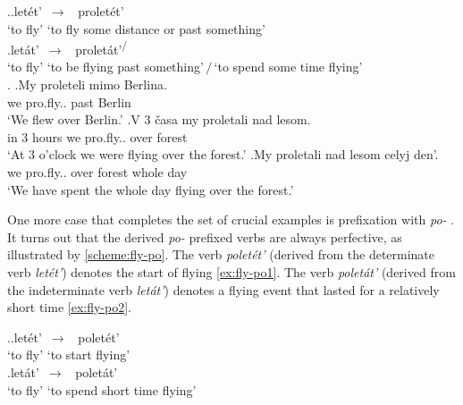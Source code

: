 \ex.\label{scheme:fly-pro}\ag.let\'{e}t'\textsuperscript{\IPF}~$\to$~ prolet\'{e}t'\textsuperscript{\PF}\\
{`to fly'} {`to fly some distance or past  something'}\\
\bg.let\'{a}t'\textsuperscript{\IPF}~$\to$~ prolet\'{a}t'\textsuperscript{\IPF\slash\PF}\\
{`to fly'} {`to be flying past  something'\,$/$\,`to spend some time flying'}\\

\ex.\label{ex:fly-pro}
\ag.\label{ex:fly-pro1}My proleteli\textsuperscript{\PF} mimo Berlina.\\
we pro.fly.. past  Berlin\\
\trans `We flew over Berlin.'
\bg.\label{ex:fly-pro2}V 3 \v{c}asa my proletali\textsuperscript{\IPF} nad lesom.\\
in 3 hours we pro.fly.. over forest\\
\trans `At 3 o'clock we were flying over the forest.'
\bg.\label{ex:fly-pro3}My proletali\textsuperscript{\PF} nad lesom celyj den'.\\
we pro.fly.. over forest whole day\\
\trans `We have spent the whole day flying over the forest.'

One more case that completes the set of crucial examples is prefixation  with \textit{po-}  . It turns out that the derived \textit{po-}  prefixed verbs are always perfective, as illustrated by \ref{scheme:fly-po}. The verb \textit{polet\'{e}t'\textsuperscript{\PF}} (derived from the determinate verb  \textit{let\'{e}t'\textsuperscript{\IPF}}) denotes the start of flying \ref{ex:fly-po1}. The verb \textit{polet\'{a}t'\textsuperscript{\PF}} (derived from the indeterminate verb  \textit{let\'{a}t'\textsuperscript{\IPF}}) denotes a flying event that lasted for a relatively short time \ref{ex:fly-po2}.

\ex.\label{scheme:fly-po}\ag.let\'{e}t'\textsuperscript{\IPF}~$\to$~ polet\'{e}t'\textsuperscript{\PF}\\
{`to fly'} {`to start flying'}\\
\bg.let\'{a}t'\textsuperscript{\IPF}~$\to$~ polet\'{a}t'\textsuperscript{\PF}\\
{`to fly'} {`to spend short time flying'}\\

